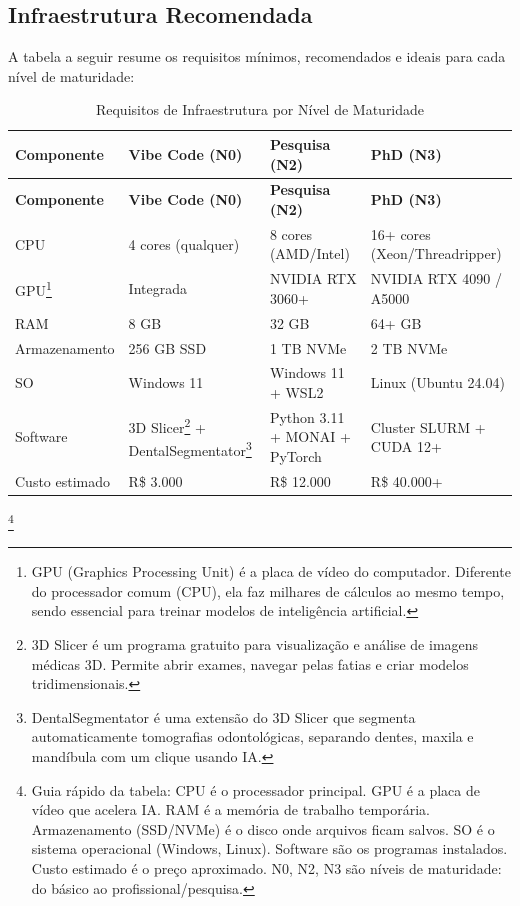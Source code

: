\subsection{Infraestrutura Recomendada}

A tabela a seguir resume os requisitos mínimos, recomendados e ideais para cada nível de maturidade:

\footnotesize
\begin{longtable}[c]{p{3cm}p{3.5cm}p{3.5cm}p{3.5cm}}
\caption{Requisitos de Infraestrutura por Nível de Maturidade} \\
\toprule
\textbf{Componente} & \textbf{Vibe Code (N0)} & \textbf{Pesquisa (N2)} & \textbf{PhD (N3)} \\
\midrule
\endfirsthead
\toprule
\textbf{Componente} & \textbf{Vibe Code (N0)} & \textbf{Pesquisa (N2)} & \textbf{PhD (N3)} \\
\midrule
\endhead
\bottomrule
\endfoot
CPU & 4 cores (qualquer) & 8 cores (AMD/Intel) & 16+ cores (Xeon/Threadripper) \\
GPU\footnote{GPU (Graphics Processing Unit) é a placa de vídeo do computador. Diferente do processador comum (CPU), ela faz milhares de cálculos ao mesmo tempo, sendo essencial para treinar modelos de inteligência artificial.} & Integrada & NVIDIA RTX 3060+ & NVIDIA RTX 4090 / A5000 \\
RAM & 8 GB & 32 GB & 64+ GB \\
Armazenamento & 256 GB SSD & 1 TB NVMe & 2 TB NVMe \\
SO & Windows 11 & Windows 11 + WSL2 & Linux (Ubuntu 24.04) \\
Software & 3D Slicer\footnote{3D Slicer é um programa gratuito para visualização e análise de imagens médicas 3D. Permite abrir exames, navegar pelas fatias e criar modelos tridimensionais.} + DentalSegmentator\footnote{DentalSegmentator é uma extensão do 3D Slicer que segmenta automaticamente tomografias odontológicas, separando dentes, maxila e mandíbula com um clique usando IA.} & Python 3.11 + MONAI + PyTorch & Cluster SLURM + CUDA 12+ \\
Custo estimado & R\$ 3.000 & R\$ 12.000 & R\$ 40.000+ \\
\bottomrule
\end{longtable}
\normalsize\footnote{Guia rápido da tabela: CPU é o processador principal. GPU é a placa de vídeo que acelera IA. RAM é a memória de trabalho temporária. Armazenamento (SSD/NVMe) é o disco onde arquivos ficam salvos. SO é o sistema operacional (Windows, Linux). Software são os programas instalados. Custo estimado é o preço aproximado. N0, N2, N3 são níveis de maturidade: do básico ao profissional/pesquisa.}

